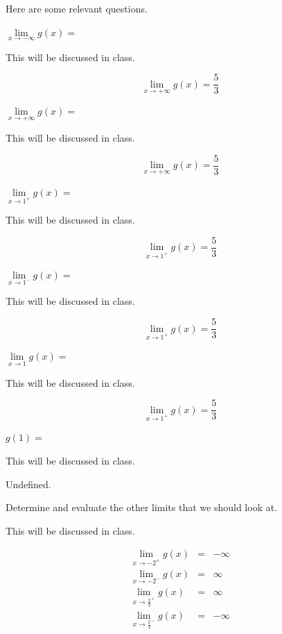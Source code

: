 \documentclass[12pt,addpoints, answers, fleqn]{exam}
\begin{document}
Here are some relevant questions.
\begin{questions}
\question $\displaystyle \mathop {\lim }\limits_{x \to -\infty }  g \left( x \right) = $
\begin{solution}
This will be discussed in class.

\[
\lim_{x \to +\infty }  g \left( x \right) = \frac{5}{3}
\]
\end{solution}


\question $\displaystyle \mathop {\lim }\limits_{x \to +\infty }  g \left( x \right) = $
\begin{solution}
This will be discussed in class.

\[
\lim_{x \to +\infty }  g \left( x \right) = \frac{5}{3}
\]
\end{solution}


\question $\displaystyle \mathop {\lim }\limits_{x \to 1^+ }  g \left( x \right) = $
\begin{solution}
This will be discussed in class.

\[
\lim_{x \to 1^+ }  g \left( x \right) = \frac{5}{3}
\]
\end{solution}


\question $\displaystyle \mathop {\lim }\limits_{x \to 1^- }  g \left( x \right) = $
\begin{solution}
This will be discussed in class.

\[
\lim_{x \to 1^+ }  g \left( x \right) = \frac{5}{3}
\]
\end{solution}


\question $\displaystyle \mathop {\lim }\limits_{x \to 1 }  g \left( x \right) = $
\begin{solution}
This will be discussed in class.

\[
\lim_{x \to 1^+ }  g \left( x \right) = \frac{5}{3}
\]
\end{solution}


\question $\displaystyle g \left( 1 \right) = $
\begin{solution}
This will be discussed in class.

Undefined.
\end{solution}


\question Determine and evaluate the other limits that we should look at.
\begin{solution}
This will be discussed in class.

\begin{eqnarray*}
\lim_{x \to -2^+ }  g \left( x \right) &=& -\infty \\
\lim_{x \to -2^- }  g \left( x \right) &=& \infty \\
\lim_{x \to \frac{2}{3}^+ }  g \left( x \right) &=&  \infty \\
\lim_{x \to \frac{2}{3}^- }  g \left( x \right) &=& -\infty 
\end{eqnarray*}
\end{solution}


\end{questions}
 
\end{document}
